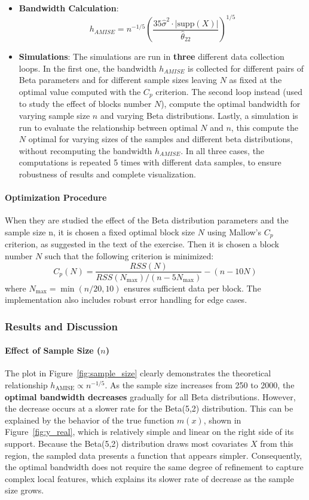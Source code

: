 \documentclass{article}
\begin{document}
\begin{itemize}
    \item \textbf{Bandwidth Calculation}:
    \[
    h_{AMISE} = n^{-1/5} \left( \frac{35 \hat{\sigma}^2 \cdot |\text{supp}(X)|}{\hat{\theta}_{22}} \right)^{1/5}
    \]

    \item \textbf{Simulations}: 
    The simulations are run in \textbf{three} different data collection loops. In the first one, the bandwidth $h_{AMISE}$
    is collected for different pairs of Beta parameters and for different sample sizes leaving $N$ as fixed at the optimal value computed with the $C_p$ criterion.
    The second loop instead (used to study the effect of blocks number $N$), compute the optimal bandwidth for varying sample size $n$ and varying Beta distributions. 
    Lastly, a simulation is run to evaluate the relationship between optimal $N$ and $n$, this compute the $N$ optimal for varying sizes of the samples and different beta distributions, without recomputing the bandwidth $h_{AMISE}$.
    In all three cases, the computations is repeated 5 times with different data samples, to ensure robustness of results and complete visualization.
\end{itemize}

\paragraph{Optimization Procedure}
When they are studied the effect of the Beta distribution parameters and the sample size n, it is chosen a fixed optimal block size $N$ using Mallow's $C_p$ criterion, as suggested in the text of the exercise.
Then it is chosen a block number $N$ such that the following criterion is minimized:
\[
C_p(N) = \frac{RSS(N)}{RSS(N_{\max})/(n-5N_{\max})} - (n - 10N)
\]
where $N_{\max} = \min(n/20, 10)$ ensures sufficient data per block. The implementation also includes robust error handling for edge cases.

\subsubsection*{Results and Discussion}

\paragraph{Effect of Sample Size ($n$)}

The plot in Figure~\ref{fig:sample_size} clearly demonstrates the theoretical relationship \( h_{\text{AMISE}} \propto n^{-1/5} \). As the sample size increases from 250 to 2000, the \textbf{optimal bandwidth decreases} gradually for all Beta distributions. 
However, the decrease occurs at a slower rate for the Beta(5,2) distribution. This can be explained by the behavior of the true function \( m(x) \), shown in Figure~\ref{fig:y_real}, which is relatively simple and linear on the right side of its support. 
Because the Beta(5,2) distribution draws most covariates \( X \) from this region, the sampled data presents a function that appears simpler. Consequently, the optimal bandwidth does not require the same degree of refinement to capture complex local features, 
which explains its slower rate of decrease as the sample size grows.
\end{document}
